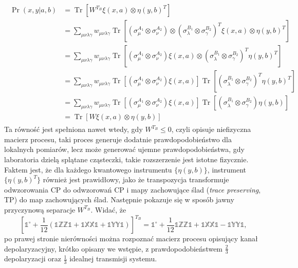 \documentclass[10pt]{article} %
\DeclareMathOperator{\Trs}{Tr}
\newcommand{\X}{\mathbb{X}}
\newcommand{\Y}{\mathbb{Y}}
\newcommand{\Z}{\mathbb{Z}}
\newcommand{\I}{\mathbb{1}}
\newcommand{\IO}{\mathbb{1}^\circ}
\begin{document}
\begin{align}
\begin{split}
\Pr(x,y|a,b) &= \Trs\left[W^{T_B} \xi(x,a) \otimes \eta(y,b)^{T}\right] \\
	&= \sum_{\mu\nu\lambda\gamma} w_{\mu\nu\lambda\gamma} \Trs \left[ (\sigma_\mu^{A_1}\otimes\sigma_\nu^{A_2})\otimes(\sigma_\lambda^{B_1}\otimes\sigma_\gamma^{B_2})^T \xi(x,a) \otimes \eta(y,b)^{T} \right] \\
	&= \sum_{\mu\nu\lambda\gamma} w_{\mu\nu\lambda\gamma} \Trs \left[ (\sigma_\mu^{A_1}\otimes\sigma_\nu^{A_2}) \xi(x,a) \otimes (\sigma_\lambda^{B_1}\otimes\sigma_\gamma^{B_2})^T\eta(y,b)^{T} \right] \\
	&= \sum_{\mu\nu\lambda\gamma} w_{\mu\nu\lambda\gamma}  \Trs \left[ (\sigma_\mu^{A_1}\otimes\sigma_\nu^{A_2}) \xi(x,a)\right] \Trs \left[ (\sigma_\lambda^{B_1}\otimes\sigma_\gamma^{B_2})^T\eta(y,b)^{T} \right] \\
	&= \sum_{\mu\nu\lambda\gamma} w_{\mu\nu\lambda\gamma}  \Trs \left[ (\sigma_\mu^{A_1}\otimes\sigma_\nu^{A_2}) \xi(x,a)\right] \Trs \left[ (\sigma_\lambda^{B_1}\otimes\sigma_\gamma^{B_2})\eta(y,b) \right] \\
	&=  \Trs\left[W \xi(x,a) \otimes \eta(y,b)\right]
\end{split}
\end{align}
Ta równość jest spełniona nawet wtedy, gdy $W^{T_B} \leq 0$, czyli opisuje niefizyczna macierz procesu, taki proces generuje dodatnie prawdopodobieństwo dla lokalnych pomiarów, lecz może generować ujemne prawdopodobieństwa, gdy laboratoria dzielą splątane cząsteczki, takie rozszerzenie jest istotne fizycznie.
Faktem jest, że dla każdego kwantowego instrumentu $\{ \eta(y,b) \}$, instrument $\{ \eta(y,b)^T \}$ również jest prawidłowy, jako że transpozycja transformuje odwzorowania CP do odwzorowań CP i mapy zachowujące ślad (\textit{trace preserving}, TP) do map zachowujących ślad. Następnie pokazuje się w sposób jawny przyczynową
separacje $W^{T_B}$. Widać, że 
\begin{equation}
\left[\IO + \frac{1}{12}\left(\I\Z\Z\I + \I\X\X\I + \I\Y\Y\I\right)\right]^{T_B} = \IO + \frac{1}{12}\I\Z\Z\I + \I\X\X\I - \I\Y\Y\I, 
\end{equation}
po prawej stronie nierówności można rozpoznać macierz procesu opisujący kanał depolaryzacyjny, krótko opisany we wstępie, z prawdopodobieństwem $\frac{2}{3}$ depolaryzacji oraz $\frac{1}{3}$ idealnej transmisji systemu.
\end{document}
